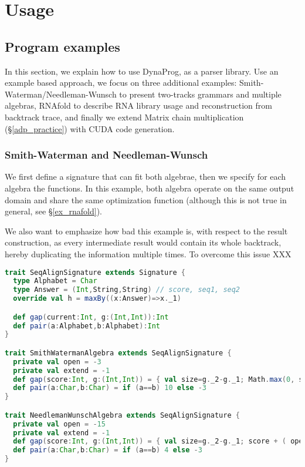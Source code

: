 \newpage
\section{Usage} \label{usage}
\subsection{Program examples}
In this section, we explain how to use DynaProg, as a parser library. Use an example based approach, we focus on three additional examples: Smith-Waterman/Needleman-Wunsch to present two-tracks grammars and multiple algebras, RNAfold\cite{gpu_rnafold} to describe RNA library usage and reconstruction from backtrack trace, and finally we extend Matrix chain multiplication (\S\ref{adp_practice}) with CUDA code generation.

\subsubsection{Smith-Waterman and Needleman-Wunsch} \label{ex_swat}
We first define a signature that can fit both algebrae, then we specify for each algebra the functions. In this example, both algebra operate on the same output domain and share the same optimization function (although this is not true in general, see \S\ref{ex_rnafold}).

We also want to emphasize how bad this example is, with respect to the result construction, as every intermediate result would contain its whole backtrack, hereby duplicating the information multiple times. To overcome this issue {\color{red} XXX}
\begin{lstlisting}[language=Scala,captionpos=none]
trait SeqAlignSignature extends Signature {
  type Alphabet = Char
  type Answer = (Int,String,String) // score, seq1, seq2
  override val h = maxBy((x:Answer)=>x._1)

  def gap(current:Int, g:(Int,Int)):Int
  def pair(a:Alphabet,b:Alphabet):Int
}

trait SmithWatermanAlgebra extends SeqAlignSignature {
  private val open = -3
  private val extend = -1
  def gap(score:Int, g:(Int,Int)) = { val size=g._2-g._1; Math.max(0, score + ( open + (size-1) * extend )) }
  def pair(a:Char,b:Char) = if (a==b) 10 else -3
}

trait NeedlemanWunschAlgebra extends SeqAlignSignature {
  private val open = -15
  private val extend = -1
  def gap(score:Int, g:(Int,Int)) = { val size=g._2-g._1; score + ( open + (size-1) * extend ) }
  def pair(a:Char,b:Char) = if (a==b) 4 else -3
}
\end{lstlisting}

